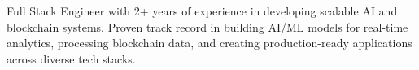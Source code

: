Full Stack Engineer with 2+ years of experience in developing scalable AI and blockchain systems. Proven track record in building AI/ML models for real-time analytics, processing blockchain data, and creating production-ready applications across diverse tech stacks.